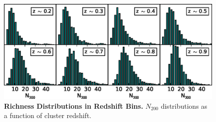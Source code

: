 \begin{figure}
\begin{center}
\includegraphics[scale=1.0]{plots_ch3/zbin_histograms.eps}
\caption[Richness Distributions in Redshift Bins]{{\bf Richness Distributions in Redshift Bins.} $N_{200}$ distributions as a function of cluster redshift.}
\label{plot:zbinhist3}
\end{center}
\end{figure}



